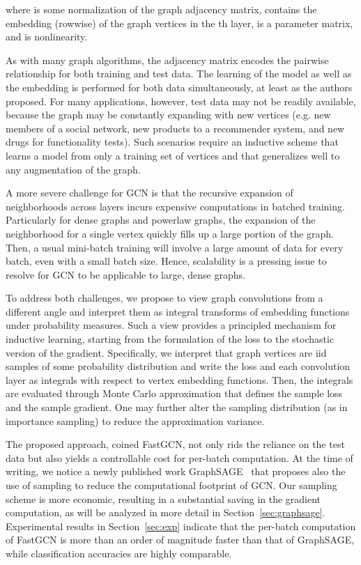\documentclass{article} \usepackage{iclr2018_conference,times}
\theoremstyle{plain}\newtheorem{theorem}{Theorem}\theoremstyle{plain}\newtheorem{proposition}[theorem]{Proposition}
\theoremstyle{plain}\newtheorem{corollary}[theorem]{Corollary}
\theoremstyle{plain}\newtheorem{lemma}[theorem]{Lemma}
\begin{document}
where  is some normalization of the graph adjacency matrix,  contains the embedding (rowwise) of the graph vertices in the th layer,  is a parameter matrix, and  is nonlinearity.

As with many graph algorithms, the adjacency matrix encodes the pairwise relationship for both training and test data. The learning of the model as well as the embedding is performed for both data simultaneously, at least as the authors proposed. For many applications, however, test data may not be readily available, because the graph may be constantly expanding with new vertices (e.g. new members of a social network, new products to a recommender system, and new drugs for functionality tests). Such scenarios require an inductive scheme that learns a model from only a training set of vertices and that generalizes well to any augmentation of the graph.

A more severe challenge for GCN is that the recursive expansion of neighborhoods across layers incurs expensive computations in batched training. Particularly for dense graphs and powerlaw graphs, the expansion of the neighborhood for a single vertex quickly fills up a large portion of the graph. Then, a usual mini-batch training will involve a large amount of data for every batch, even with a small batch size. Hence, scalability is a pressing issue to resolve for GCN to be applicable to large, dense graphs.



To address both challenges, we propose to view graph convolutions from a different angle and interpret them as integral transforms of embedding functions under probability measures. Such a view provides a principled mechanism for inductive learning, starting from the formulation of the loss to the stochastic version of the gradient. Specifically, we interpret that graph vertices are iid samples of some probability distribution and write the loss and each convolution layer as integrals with respect to vertex embedding functions. Then, the integrals are evaluated through Monte Carlo approximation that defines the sample loss and the sample gradient. One may further alter the sampling distribution (as in importance sampling) to reduce the approximation variance.

The proposed approach, coined FastGCN, not only rids the reliance on the test data but also yields a controllable cost for per-batch computation. At the time of writing, we notice a newly published work GraphSAGE~\citep{DBLP:journals/corr/HamiltonYL17} that proposes also the use of sampling to reduce the computational footprint of GCN. Our sampling scheme is more economic, resulting in a substantial saving in the gradient computation, as will be analyzed in more detail in Section~\ref{sec:graphsage}. Experimental results in Section~\ref{sec:exp} indicate that the per-batch computation of FastGCN is more than an order of magnitude faster than that of GraphSAGE, while classification accuracies are highly comparable.
\end{document}
